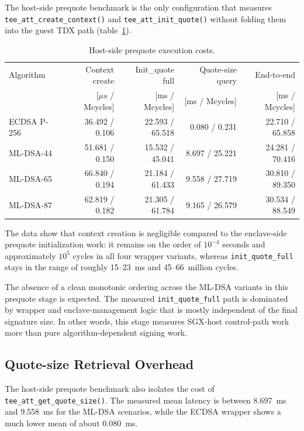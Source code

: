 The host-side prequote benchmark is the only configuration that measures
\texttt{tee\_att\_create\_context()} and \texttt{tee\_att\_init\_quote()}
without folding them into the guest TDX path
(table~\ref{tab:wrapper-latency}).

\begin{table}[t]
\centering
\small
\caption{Host-side prequote execution costs.}
\label{tab:wrapper-latency}
\begin{tabular}{|l|r|r|r|r|}
\hline
Algorithm & Context create & Init\_quote full & Quote-size query & End-to-end \\
 & [\(\mu s\) / Mcycles] & [ms / Mcycles] & [ms / Mcycles] & [ms / Mcycles] \\
\hline
ECDSA P-256 & 36.492 / 0.106 & 22.593 / 65.518 & 0.080 / 0.231 & 22.710 / 65.858 \\
ML-DSA-44 & 51.681 / 0.150 & 15.532 / 45.041 & 8.697 / 25.221 & 24.281 / 70.416 \\
ML-DSA-65 & 66.840 / 0.194 & 21.184 / 61.433 & 9.558 / 27.719 & 30.810 / 89.350 \\
ML-DSA-87 & 62.819 / 0.182 & 21.305 / 61.784 & 9.165 / 26.579 & 30.534 / 88.549 \\
\hline
\end{tabular}
\end{table}

The data show that context creation is negligible compared to the enclave-side
prequote initialization work: it remains on the order of \(10^{-4}\) seconds
and approximately \(10^{5}\) cycles in all four wrapper variants, whereas
\texttt{init\_quote\_full} stays in the range of roughly 15--23~ms and
45--66~million cycles.

The absence of a clean monotonic ordering across the ML-DSA variants in this
prequote stage is expected. The measured \texttt{init\_quote\_full} path is
dominated by wrapper and enclave-management logic that is mostly independent of
the final signature size. In other words, this stage measures SGX-host
control-path work more than pure algorithm-dependent signing work.

\subsection{Quote-size Retrieval Overhead}

The host-side prequote benchmark also isolates the cost of
\texttt{tee\_att\_get\_quote\_size()}. The measured mean latency is between
8.697~ms and 9.558~ms for the ML-DSA scenarios, while the ECDSA wrapper shows
a much lower mean of about 0.080~ms.

